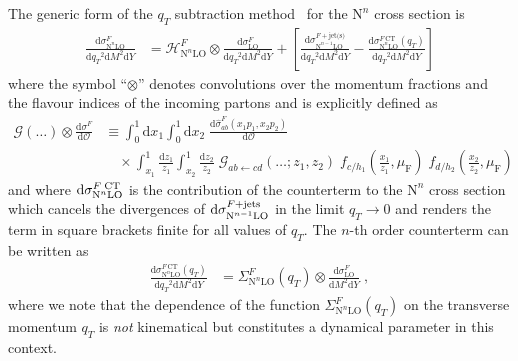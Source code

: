 \documentclass[12pt]{article}
\DeclareRobustCommand{\muf}{\ensuremath{\mu_{\mathrm{F}}}\xspace}
\DeclareRobustCommand{\qt}{\ensuremath{q_T}\xspace}
\DeclareRobustCommand{\rd}{\ensuremath{\mathrm{d}}}
\DeclareRobustCommand{\cO}{\ensuremath{\mathcal{O}}}
\DeclareRobustCommand{\cG}{\ensuremath{\mathcal{G}}}
\DeclareRobustCommand{\cH}{\ensuremath{\mathcal{H}}}
\DeclareRobustCommand{\obs}{\cO\xspace}
\DeclareRobustCommand{\jets}{\text{jet(s)}\xspace}
\DeclareRobustCommand{\CT}{\text{CT}\xspace}
\DeclareRobustCommand{\LO}{\text{LO}\xspace}
\DeclareRobustCommand{\N}[1]{\ensuremath{\text{N}^{#1}}} %
\begin{document}
The generic form of the $\qt$ subtraction method~\cite{Catani:2007vq} for the \N{n}\LO cross section is
\begin{align}
  \frac{\rd\sigma^{F}_{\N{n}\LO}}{\rd\qt^2\rd M^2\rd Y}
  &=
  \cH^F_{\N{n}\LO} \otimes
  \frac{\rd\sigma^{F}_{\LO}}{\rd\qt^2\rd M^2\rd Y} +
  \left[ 
    \frac{\rd\sigma^{F+\jets}_{\N{n-1}\LO}}{\rd\qt^2\rd M^2\rd Y} -
    \frac{\rd\sigma^{F\,\CT}_{\N{n}\LO}(\qt)}{\rd\qt^2\rd M^2\rd Y}
  \right]
  \label{eq:master}
\end{align}
where the symbol ``$\otimes$'' denotes convolutions over the momentum fractions and the flavour indices of the incoming partons and is explicitly defined as
\begin{align}
  \cG(\dots) \otimes \frac{\rd\sigma^{F}}{\rd\obs} 
  &\equiv
  \int_0^1\rd x_1 \int_0^1\rd x_2 \;
  \frac{\rd\hat{\sigma}^{F}_{ab}(x_1 p_1, x_2 p_2)}{\rd\obs}
  \nonumber\\&\quad
  \times 
  \int_{x_1}^1 \frac{\rd z_1}{z_1} \int_{x_2}^1 \frac{\rd z_2}{z_2} \; 
  \cG_{ab \gets cd}(\ldots; z_1, z_2) \;
  f_{c/h_1}\left(\frac{x_1}{z_1},\muf\right) \; f_{d/h_2}\left(\frac{x_2}{z_2},\muf\right) \;
\end{align}
and where $\rd\sigma^{F\;{\rm CT}}_{\N{n}\LO}$ is the contribution of the counterterm to the \N{n}\LO cross section which cancels the divergences of $\rd\sigma^{F+{\rm jets}}_{\N{n-1}\LO}$ in the limit $\qt \rightarrow 0$ and renders the term in square brackets finite for all values of $\qt$. 
The $n$-th order counterterm can be written as
\begin{align}
  \frac{\rd\sigma^{F\,\CT}_{\N{n}\LO}(\qt)}{\rd\qt^2\rd M^2\rd Y}
  &=
  \Sigma^F_{\N{n}\LO}(\qt) \otimes
  \frac{\rd\sigma^{F}_{\LO}}{\rd M^2\rd Y} \;,
  \label{eq:CT}
\end{align}
where we note that the dependence of the function $\Sigma^{F}_{\N{n}\LO}(\qt)$ on the transverse momentum $\qt$ is \emph{not} kinematical but constitutes a dynamical parameter in this context.
\end{document}
